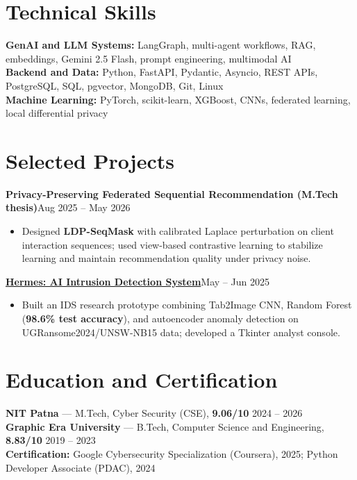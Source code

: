 \documentclass[a4paper,11pt]{article}
\newcommand{\proj}[2]{\textbf{#1}\hfill{\footnotesize #2}\vspace{-4pt}}
\newenvironment{tightbullets}{\begin{itemize}[leftmargin=1.25em,label=\textbullet,topsep=2pt,itemsep=2pt,parsep=0pt,partopsep=0pt]}{\end{itemize}\vspace{-4pt}}
\newcommand{\skill}[2]{\textbf{#1:} #2\\[1pt]}
\begin{document}
\section{Technical Skills}
{\small
\skill{GenAI and LLM Systems}{LangGraph, multi-agent workflows, RAG, embeddings, Gemini 2.5 Flash, prompt engineering, multimodal AI}
\skill{Backend and Data}{Python, FastAPI, Pydantic, Asyncio, REST APIs, PostgreSQL, SQL, pgvector, MongoDB, Git, Linux}
\skill{Machine Learning}{PyTorch, scikit-learn, XGBoost, CNNs, federated learning, local differential privacy}
}
\section{Selected Projects}
\proj{Privacy-Preserving Federated Sequential Recommendation (M.Tech thesis)}{Aug 2025 -- May 2026}
\begin{tightbullets}
\item Designed \textbf{LDP-SeqMask} with calibrated Laplace perturbation on client interaction sequences; used view-based contrastive learning to stabilize learning and maintain recommendation quality under privacy noise.
\end{tightbullets}
\proj{\href{https://github.com/devanshukranjan/AI-Cybersecurity-Portfolio/tree/main/ai-intrusion-detection/hermes-ids}{Hermes: AI Intrusion Detection System}}{May -- Jun 2025}
\begin{tightbullets}
\item Built an IDS research prototype combining Tab2Image CNN, Random Forest (\textbf{98.6\% test accuracy}), and autoencoder anomaly detection on UGRansome2024/UNSW-NB15 data; developed a Tkinter analyst console.
\end{tightbullets}

\section{Education and Certification}
{\small\textbf{NIT Patna} --- M.Tech, Cyber Security (CSE), \textbf{9.06/10} \hfill 2024 -- 2026\\[1pt]
\textbf{Graphic Era University} --- B.Tech, Computer Science and Engineering, \textbf{8.83/10} \hfill 2019 -- 2023\\[1pt]
\textbf{Certification:} Google Cybersecurity Specialization (Coursera), 2025; Python Developer Associate (PDAC), 2024}
\end{document}
